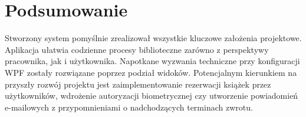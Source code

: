 \chapter{Podsumowanie}
Stworzony system pomyślnie zrealizował wszystkie kluczowe założenia projektowe. Aplikacja ułatwia codzienne procesy biblioteczne zarówno z perspektywy pracownika, jak i użytkownika. Napotkane wyzwania techniczne przy konfiguracji WPF zostały rozwiązane poprzez podział widoków. Potencjalnym kierunkiem na przyszły rozwój projektu jest zaimplementowanie rezerwacji książek przez użytkowników, wdrożenie autoryzacji biometrycznej czy utworzenie powiadomień e-mailowych z przypomnieniami o nadchodzących terminach zwrotu.
